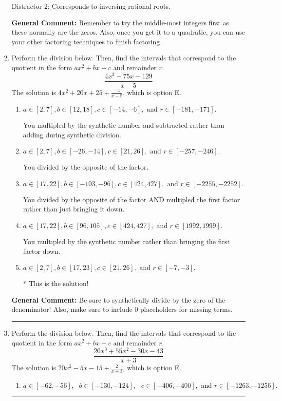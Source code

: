 \documentclass{extbook}[14pt]
\newcommand{\litem}[1]{\item #1

\rule{\textwidth}{0.4pt}}
\begin{document}
\begin{enumerate}
{\begin{enumerate}[label=\Alph*.]
 Distractor 2: Corresponds to inversing rational roots.
\end{enumerate}

\textbf{General Comment:} Remember to try the middle-most integers first as these normally are the zeros. Also, once you get it to a quadratic, you can use your other factoring techniques to finish factoring.
}
\litem{
Perform the division below. Then, find the intervals that correspond to the quotient in the form $ax^2+bx+c$ and remainder $r$.
\[ \frac{4x^{3} -75 x -129}{x -5} \]The solution is \( 4x^{2} +20 x + 25 + \frac{-4}{x -5} \), which is option E.\begin{enumerate}[label=\Alph*.]
\item \( a \in [2, 7], b \in [12, 18], c \in [-14, -6], \text{ and } r \in [-181, -171]. \)

 You multipled by the synthetic number and subtracted rather than adding during synthetic division.
\item \( a \in [2, 7], b \in [-26, -14], c \in [21, 26], \text{ and } r \in [-257, -246]. \)

 You divided by the opposite of the factor.
\item \( a \in [17, 22], b \in [-103, -96], c \in [424, 427], \text{ and } r \in [-2255, -2252]. \)

 You divided by the opposite of the factor AND multipled the first factor rather than just bringing it down.
\item \( a \in [17, 22], b \in [96, 105], c \in [424, 427], \text{ and } r \in [1992, 1999]. \)

 You multipled by the synthetic number rather than bringing the first factor down.
\item \( a \in [2, 7], b \in [17, 23], c \in [21, 26], \text{ and } r \in [-7, -3]. \)

* This is the solution!
\end{enumerate}

\textbf{General Comment:} Be sure to synthetically divide by the zero of the denominator! Also, make sure to include 0 placeholders for missing terms.
}
\litem{
Perform the division below. Then, find the intervals that correspond to the quotient in the form $ax^2+bx+c$ and remainder $r$.
\[ \frac{20x^{3} +55 x^{2} -30 x -43}{x + 3} \]The solution is \( 20x^{2} -5 x -15 + \frac{2}{x + 3} \), which is option E.\begin{enumerate}[label=\Alph*.]
\item \( a \in [-62, -56], \text{   } b \in [-130, -124], \text{   } c \in [-406, -400], \text{   and   } r \in [-1263, -1256]. \)


\end{enumerate}}
\end{enumerate}
\end{document}
